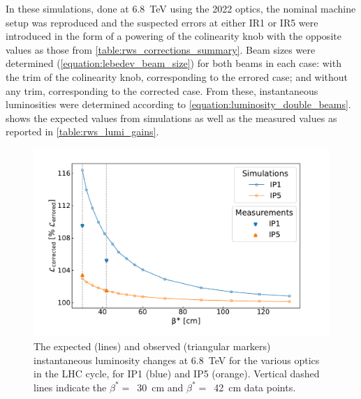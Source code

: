 In these simulations, done at \qty{6.8}{\tera\electronvolt} using the \num{2022} optics, the nominal machine setup was reproduced and the suspected errors at either IR\num{1} or IR\num{5} were introduced in the form of a powering of the colinearity knob with the opposite values as those from \cref{table:rws_corrections_summary}.
Beam sizes were determined (\cref{equation:lebedev_beam_size}) for both beams in each case: with the trim of the colinearity knob, corresponding to the errored case; and without any trim, corresponding to the corrected case.
From these, instantaneous luminosities were determined according to \cref{equation:luminosity_double_beams}.
 shows the expected values from simulations as well as the measured values as reported in \cref{table:rws_lumi_gains}.

\begin{figure}[!htb]
    \centering
    \includegraphics*[width=\textwidth]{Figures/IR_Coupling_Correction/expected_vs_observed_lumigains.pdf}
    \caption{The expected (lines) and observed (triangular markers) instantaneous luminosity changes at \qty{6.8}{\tera\electronvolt} for the various optics in the LHC cycle, for IP\num{1} (\textcolor{mplblue}{blue}) and IP\num{5} (\textcolor{mplorange}{orange}). Vertical dashed lines indicate the \(\beta^{\ast} =\)~\qty{30}{\centi\meter} and \(\beta^{\ast} =\)~\qty{42}{\centi\meter} data points.}
    \label{figure:expected_vs_observed_lumigains}
\end{figure}

